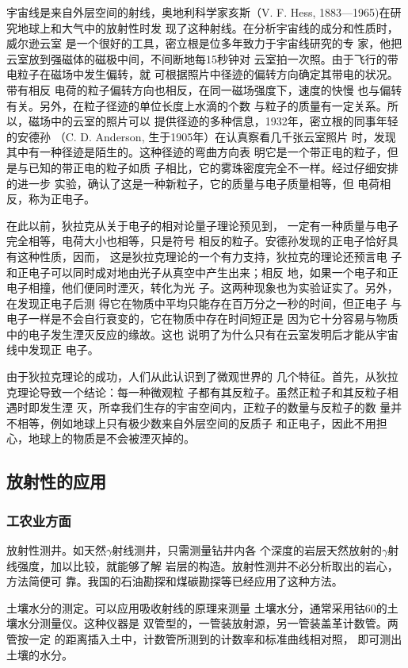 宇宙线是来自外层空间的射线，奥地利科学家亥斯（V. 
F. Hess, 1883—1965)在研究地球上和大气中的放射性时发
现了这种射线。在分析宇宙线的成分和性质时，威尔逊云室
是一个很好的工具，密立根是位多年致力于宇宙线研究的专
家，他把云室放到强磁体的磁极中间，不间断地每15秒钟对
云室拍一次照。由于飞行的带电粒子在磁场中发生偏转，就
可根据照片中径迹的偏转方向确定其带电的状况。带有相反
电荷的粒子偏转方向也相反，在同一磁场强度下，速度的快慢
也与偏转有关。另外，在粒子径迹的单位长度上水滴的个数
与粒子的质量有一定关系。所以，磁场中的云室的照片可以
提供径迹的多种信息，1932年，密立根的同事年轻的安德孙
（C. D. Anderson, 生于1905年）在认真察看几千张云室照片
时，发现其中有一种径迹是陌生的。这种径迹的弯曲方向表
明它是一个带正电的粒子，但是与已知的带正电的粒子如质
子相比，它的雾珠密度完全不一样。经过仔细安排的进一步
实验，确认了这是一种新粒子，它的质量与电子质量相等，但
电荷相反，称为正电子。

在此以前，狄拉克从关于电子的相对论量子理论预见到，
一定有一种质量与电子完全相等，电荷大小也相等，只是符号
相反的粒子。安德孙发现的正电子恰好具有这种性质，因而，
这是狄拉克理论的一个有力支持，狄拉克的理论还预言电
子和正电子可以同时成对地由光子从真空中产生出来；相反
地，如果一个电子和正电子相撞，他们便同时湮灭，转化为光
子。这两种现象也为实验证实了。另外，在发现正电子后测
得它在物质中平均只能存在百万分之一秒的时间，但正电子
与电子一样是不会自行衰变的，它在物质中存在时间短正是
因为它十分容易与物质中的电子发生湮灭反应的缘故。这也
说明了为什么只有在云室发明后才能从宇宙线中发现正
电子。

由于狄拉克理论的成功，人们从此认识到了微观世界的
几个特征。首先，从狄拉克理论导致一个结论：每一种微观粒
子都有其反粒子。虽然正粒子和其反粒子相遇时即发生湮
灭，所幸我们生存的宇宙空间内，正粒子的数量与反粒子的数
量并不相等，例如地球上只有极少数来自外层空间的反质子
和正电子，因此不用担心，地球上的物质是不会被湮灭掉的。

\subsection{放射性的应用}
\subsubsection{工农业方面}
放射性测井。如天然$\gamma$射线测井，只需测量钻井内各
个深度的岩层天然放射的$\gamma$射线强度，加以比较，就能够了解
岩层的构造。放射性测井不必分析取出的岩心，方法简便可
靠。我国的石油勘探和煤碳勘探等已经应用了这种方法。

土壤水分的测定。可以应用吸收射线的原理来测量
土壤水分，通常采用钴60的土壤水分测量仪。这种仪器是
双管型的，一管装放射源，另一管装盖革计数管。两管按一定
的距离插入土中，计数管所测到的计数率和标准曲线相对照，
即可测出土壤的水分。


